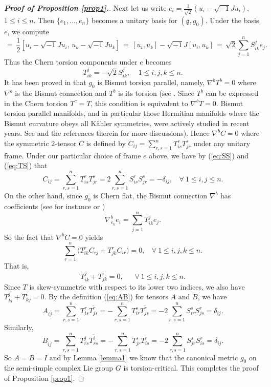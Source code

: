 \documentclass{amsart}
\begin{document}
{\begin{proof}[{\bf Proof of Proposition \ref{prop1}.}]
Next let us write $e_i=\frac{1}{\sqrt{2}}(u_i - \sqrt{-1}Ju_i)$, $1\leq i\leq n$. Then $\{ e_1, \ldots , e_n\}$ becomes a unitary basis for $({\mathfrak g}, g_0)$. Under the basis $e$, we compute
\begin{equation*}
[e_i,e_k] \,= \,\frac{1}{2}[ u_i - \sqrt{-1}Ju_i, \,u_k - \sqrt{-1}Ju_k] \, = \, [u_i,u_k] - \sqrt{-1}J [u_i,u_k] \, = \, \sqrt{2}\sum_{j=1}^n S^j_{ik}e_j.
\end{equation*}
Thus the Chern torsion components under $e$ becomes 
\begin{equation} \label{eq:TS}
T^j_{ik} = - \sqrt{2}S^j_{ik}, \ \ \ \ \ 1 \leq i,j,k\leq n. 
\end{equation}
It has been proved in \cite[Theorem 1.2]{PodestaZ} that $g_0$ is Bismut torsion parallel, namely, $\nabla^bT^b=0$ where $\nabla^b$ is the Bismut connection and $T^b$ is its torsion (see \cite{Bismut}. Since $T^b$ can be expressed in the Chern torsion $T^c=T$, this condition is equivalent to $\nabla^bT=0$. Bismut torsion parallel manifolds, and in particular those Hermitian manifolds where the Bismut curvature obeys all K\"ahler symmetries, were actively studied in recent years. See \cite{YZZ, ZZ, Zheng} and the references therein for more discussions). Hence $\nabla^bC=0$ where the symmetric $2$-tensor $C$ is defined by $C_{ij}=\sum_{r,s=1}^n T^r_{is}T^s_{jr}$ under any unitary frame. Under our particular choice of frame $e$ above, we have by (\ref{eq:SS}) and (\ref{eq:TS}) that
$$ C_{ij} = \sum_{r,s=1}^n T^r_{is}T^s_{jr} = 2 \sum_{r,s=1}^n S^r_{is}S^s_{jr} = -\delta_{ij}, \ \ \ \ \forall \ 1\leq i,j\leq n. $$
On the other hand, since $g_0$ is Chern flat, the Bismut connection $\nabla^b$ has coefficients (see for instance \cite{YZ} or \cite{VYZ})
$$ \nabla^b_{e_k}e_i = \sum_{j=1}^n T^j_{ik}e_j. $$
So the fact that $\nabla^bC=0$ yields
$$ \sum_{r=1}^n \big( T^r_{ik}C_{rj} + T^r_{jk}C_{ir}\big) = 0, \ \ \ \ \forall  \ 1\leq i,j,k\leq n. $$
That is, 
\begin{equation}
 T^j_{ik}  + T^i_{jk} =0 , \ \ \ \ \ \ \ \forall \ 1\leq i,j,k\leq n.
\end{equation}
Since $T$ is skew-symmetric with respect to its lower two indices, we also have $T^j_{ki}+T^i_{kj}=0$. By the definition (\ref{eq:AB}) for tensors $A$ and $B$, we have
$$ A_{i\bar{j}} =\sum_{r,s=1}^n T^r_{is} \overline{T^r_{js}} = - \sum_{r,s=1}^n T^s_{ir} \overline{T^r_{js}} = -2 \sum_{r,s=1}^n S^s_{ir} S^r_{js} =\delta_{ij}. $$
Similarly,
$$ B_{i\bar{j}} =\sum_{r,s=1}^n T^j_{rs} \overline{T^i_{rs}} = - \sum_{r,s=1}^n T^s_{jr} \overline{T^r_{is}} = -2 \sum_{r,s=1}^n S^s_{jr} S^r_{is} =\delta_{ij}. $$
So $A=B=I$ and by Lemma \ref{lemma1} we know that the canonical metric  $g_0$ on the semi-simple complex Lie group $G$ is torsion-critical. This completes the proof of Proposition \ref{prop1}. 
\end{proof}

}
\end{document}
